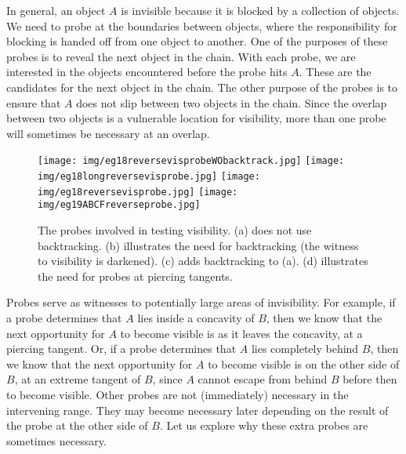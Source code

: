 \documentclass[10pt,twocolumn]{article}
\begin{document}
In general, an object $A$ is invisible because it is blocked by 
a collection of objects.
We need to probe at the boundaries between objects, where the responsibility
for blocking is handed off from one object to another.
One of the purposes of these probes is to reveal the next object in the chain.
With each probe, we are interested in the objects encountered before the probe hits $A$.
These are the candidates for the next object in the chain.
The other purpose of the probes is to ensure that $A$ does not slip between two objects in the chain.
Since the overlap between two objects is a vulnerable location for visibility,
more than one probe will sometimes be necessary at an overlap.

\begin{figure}
\begin{center}
\texttt{[image: img/eg18reversevisprobeWObacktrack.jpg]} %
\texttt{[image: img/eg18longreversevisprobe.jpg]}
\texttt{[image: img/eg18reversevisprobe.jpg]}
\texttt{[image: img/eg19ABCFreverseprobe.jpg]}
\end{center}
\caption{The probes involved in testing visibility. (a) does not use backtracking. 
        (b) illustrates the need for backtracking (the witness to visibility is darkened).
        (c) adds backtracking to (a). 
        (d) illustrates the need for probes at piercing tangents.}
\label{fig:probe}
\end{figure}

Probes serve as witnesses to potentially large areas of invisibility.
For example, if a probe determines that $A$ lies inside a concavity of $B$,
then we know that the next opportunity for $A$ to become visible is as it leaves
the concavity, at a piercing tangent.
Or, if a probe determines that $A$ lies completely behind $B$,
then we know that the next opportunity for $A$ to become visible is on the other side
of $B$, at an extreme tangent of $B$, since $A$ cannot escape 
from behind $B$ before then to become visible.
Other probes are not (immediately) necessary in the intervening range.
They may become necessary later depending on the result of the 
probe at the other side of $B$.
Let us explore why these extra probes are sometimes necessary.
\end{document}
